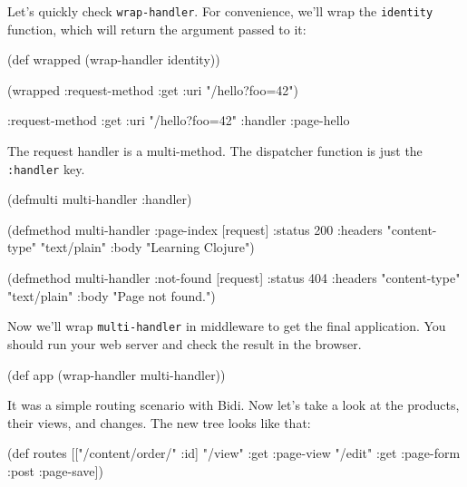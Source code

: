 Let's quickly check \verb|wrap-handler|. For convenience, we'll wrap the \verb|identity| function, which will return the argument passed to it:

\begin{english}
  \begin{clojure}
(def wrapped (wrap-handler identity))

(wrapped {:request-method :get
          :uri "/hello?foo=42"})

{:request-method :get
 :uri "/hello?foo=42"
 :handler :page-hello}
  \end{clojure}
\end{english}


The request handler is a multi-method. The dispatcher function is just the \verb|:handler| key.

\begin{english}
  \begin{clojure}
(defmulti multi-handler
  :handler)

(defmethod multi-handler :page-index
  [request]
  {:status 200
   :headers {"content-type" "text/plain"}
   :body "Learning Clojure"})

(defmethod multi-handler :not-found
  [request]
  {:status 404
   :headers {"content-type" "text/plain"}
   :body "Page not found."})
  \end{clojure}
\end{english}

Now we'll wrap \verb|multi-handler| in middleware to get the final application. You should run your web server and check the result in the browser.

\begin{english}
  \begin{clojure}
(def app (wrap-handler multi-handler))
  \end{clojure}
\end{english}

It was a simple routing scenario with Bidi. Now let's take a look at the products, their views, and changes. The new tree looks like that:

\ifx\DEVICETYPE\MOBILE

\begin{english}
  \begin{clojure}
(def routes
  [["/content/order/" :id]
   {"/view" {:get  :page-view}
    "/edit" {:get  :page-form
             :post :page-save}}])
  \end{clojure}
\end{english}

